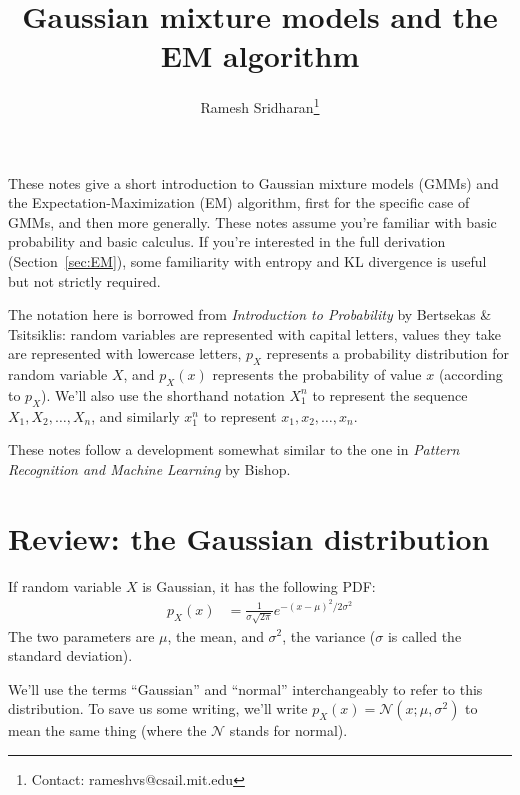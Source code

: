 \documentclass[12pt]{article}
\title{Gaussian mixture models and the EM algorithm}
\author{Ramesh Sridharan\thanks{Contact: \mbox{rameshvs@csail.mit.edu}}}
\date{}
\begin{document}
    \maketitle
    These notes give a short introduction to Gaussian mixture models (GMMs) and
    the Expectation-Maximization (EM) algorithm, first for the specific case of
    GMMs, and then more generally. These notes assume you're familiar with basic
    probability and basic calculus. If you're interested in the full derivation
    (Section~\ref{sec:EM}), some familiarity with entropy and KL divergence
    is useful but not strictly required.

    The notation here is borrowed from \emph{Introduction to Probability} by
    Bertsekas \& Tsitsiklis: random variables are represented with capital
    letters, values they take are represented with lowercase letters, $p_X$
    represents a probability distribution for random variable $X$, and $p_X(x)$
    represents the probability of value $x$ (according to $p_X$). We'll also
    use the shorthand notation $X_1^{n}$ to represent the sequence $X_1, X_2,
    \ldots, X_n$, and similarly $x_1^n$ to represent $x_1, x_2, \ldots, x_n$.

    These notes follow a development somewhat similar to the one in
    \emph{Pattern Recognition and Machine Learning} by Bishop.


    \section{Review: the Gaussian distribution}
    If random variable $X$ is Gaussian, it has the following PDF:
    \begin{align*}
        p_X(x) &= \frac{1}{\sigma \sqrt{2\pi}} e^{-(x-\mu)^2/2\sigma^2}
    \end{align*}
    The two parameters are $\mu$, the mean, and $\sigma^2$, the variance ($\sigma$
    is called the standard deviation).

    We'll use the terms ``Gaussian'' and ``normal'' interchangeably to refer to
    this distribution.  To save us some writing, we'll write $p_X(x) =
    \mathcal{N}(x; \mu, \sigma^2)$ to mean the same thing (where the
    $\mathcal{N}$ stands for normal).
\end{document}
